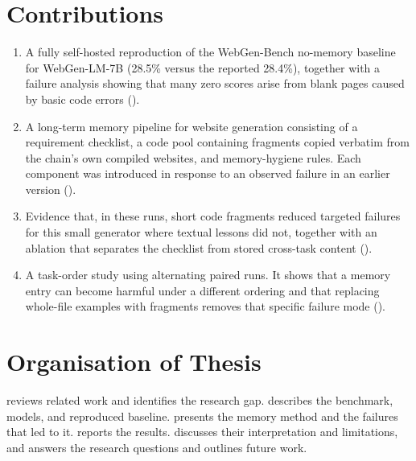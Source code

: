\section{Contributions}
\begin{enumerate}
    \item A fully self-hosted reproduction of the WebGen-Bench no-memory baseline for WebGen-LM-7B (28.5\% versus the reported 28.4\%), together with a failure analysis showing that many zero scores arise from blank pages caused by basic code errors ().
    \item A long-term memory pipeline for website generation consisting of a requirement checklist, a code pool containing fragments copied verbatim from the chain's own compiled websites, and memory-hygiene rules. Each component was introduced in response to an observed failure in an earlier version ().
    \item Evidence that, in these runs, short code fragments reduced targeted failures for this small generator where textual lessons did not, together with an ablation that separates the checklist from stored cross-task content ().
    \item A task-order study using alternating paired runs. It shows that a memory entry can become harmful under a different ordering and that replacing whole-file examples with fragments removes that specific failure mode ().
\end{enumerate}

\section{Organisation of Thesis}
 reviews related work and identifies the research gap.  describes the benchmark, models, and reproduced baseline.  presents the memory method and the failures that led to it.  reports the results.  discusses their interpretation and limitations, and  answers the research questions and outlines future work.
